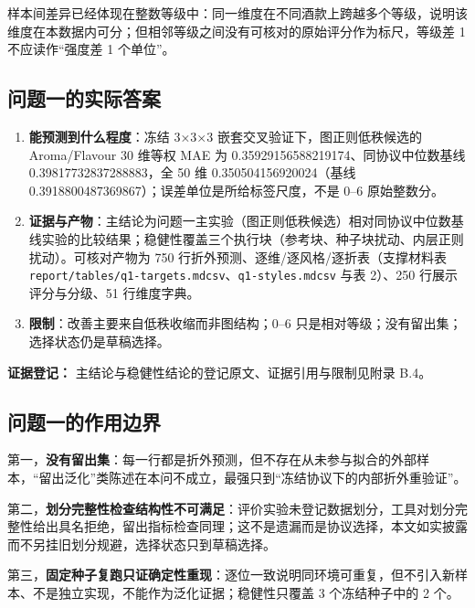\documentclass[11pt,a4paper]{article}
\providecommand{\tightlist}{%
  \setlength{\itemsep}{0pt}\setlength{\parskip}{0pt}}
\begin{document}
样本间差异已经体现在整数等级中：同一维度在不同酒款上跨越多个等级，说明该维度在本数据内可分；但相邻等级之间没有可核对的原始评分作为标尺，等级差
1 不应读作``强度差 1 个单位''。

\subsection{问题一的实际答案}\label{ux95eeux9898ux4e00ux7684ux5b9eux9645ux7b54ux6848}

\begin{enumerate}
\def\labelenumi{\arabic{enumi}.}
\tightlist
\item
  \textbf{能预测到什么程度}：冻结 3×3×3 嵌套交叉验证下，图正则低秩候选的
  Aroma/Flavour 30 维等权 MAE 为 0.35929156588219174、同协议中位数基线
  0.39817732837288883，全 50 维 0.350504156920024（基线
  0.3918800487369867）；误差单位是所给标签尺度，不是 0--6 原始整数分。
\item
  \textbf{证据与产物}：主结论为问题一主实验（图正则低秩候选）相对同协议中位数基线实验的比较结果；稳健性覆盖三个执行块（参考块、种子块扰动、内层正则扰动）。可核对产物为
  750 行折外预测、逐维/逐风格/逐折表（支撑材料表
  \texttt{report/tables/q1-targets.md\textbar{}csv}、\texttt{q1-styles.md\textbar{}csv}
  与表 2）、250 行展示评分与分级、51 行维度字典。
\item
  \textbf{限制}：改善主要来自低秩收缩而非图结构；0--6
  只是相对等级；没有留出集；选择状态仍是草稿选择。
\end{enumerate}

\textbf{证据登记：} 主结论与稳健性结论的登记原文、证据引用与限制见附录
B.4。

\subsection{问题一的作用边界}\label{ux95eeux9898ux4e00ux7684ux4f5cux7528ux8fb9ux754c}

第一，\textbf{没有留出集}：每一行都是折外预测，但不存在从未参与拟合的外部样本，``留出泛化''类陈述在本问不成立，最强只到``冻结协议下的内部折外重验证''。

第二，\textbf{划分完整性检查结构性不可满足}：评价实验未登记数据划分，工具对划分完整性给出具名拒绝，留出指标检查同理；这不是遗漏而是协议选择，本文如实披露而不另挂旧划分规避，选择状态只到草稿选择。

第三，\textbf{固定种子复跑只证确定性重现}：逐位一致说明同环境可重复，但不引入新样本、不是独立实现，不能作为泛化证据；稳健性只覆盖
3 个冻结种子中的 2 个。
\end{document}
